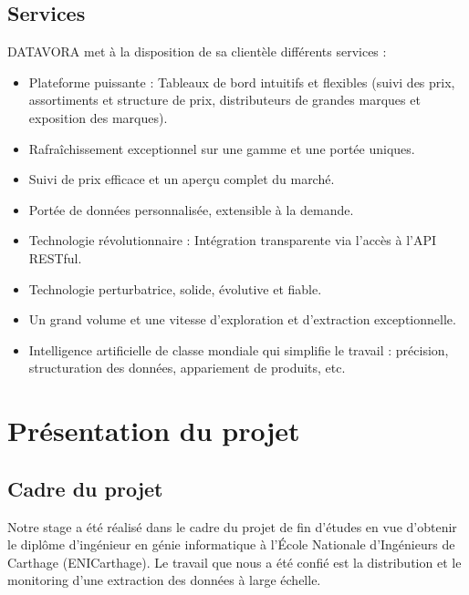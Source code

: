\subsection{Services}

DATAVORA met à la disposition de sa clientèle différents services :

\begin{itemize}[font=\normalsize]

\item Plateforme puissante : Tableaux de bord intuitifs et flexibles  (suivi des prix, assortiments et structure de prix, distributeurs de grandes marques et exposition des marques). 
 
\item Rafraîchissement exceptionnel sur une gamme et une portée uniques.

\item Suivi de prix efficace et un aperçu complet du marché.

\item Portée de données personnalisée, extensible à la demande.

\item Technologie révolutionnaire : Intégration transparente via l'accès à l'API RESTful.

\item Technologie perturbatrice, solide, évolutive et fiable.

\item Un grand volume et une vitesse d'exploration et d'extraction exceptionnelle.

\item Intelligence artificielle de classe mondiale qui simplifie le travail : précision, structuration des données, appariement de produits, etc.
\end{itemize}



\section{Présentation du projet }
\subsection{Cadre du projet}
Notre stage a été réalisé dans le cadre du projet de fin d’études en vue d’obtenir le diplôme d’ingénieur en génie informatique à l’École Nationale d’Ingénieurs de Carthage (ENICarthage). Le travail que nous a été confié est la distribution et le monitoring d’une extraction des données à large échelle.

